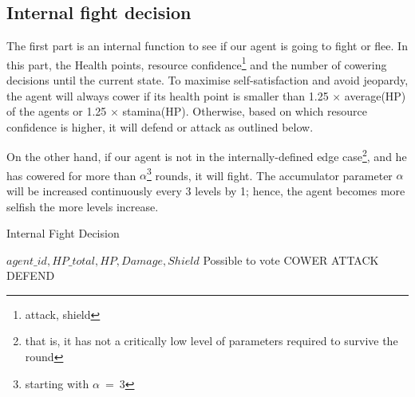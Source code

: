     \subsection{Internal fight decision}

        The first part is an internal function to see if our agent is going to fight or flee. In this part, the Health points, resource confidence\footnote{attack, shield} and the number of cowering decisions until the current state.
        To maximise self-satisfaction and avoid jeopardy, the agent will always cower if its health point is smaller  than  1.25 $\times$ average(HP) of the agents or 1.25 $\times$ stamina(HP). Otherwise, based on which resource confidence is higher, it will defend or attack as outlined below.

        On the other hand, if our agent is not in the internally-defined edge case\footnote{that is, it has not a critically low level of parameters required to survive the round}, and he has cowered for more than $\alpha$\footnote{starting with $\alpha~=~3$} rounds, it will fight. The accumulator parameter $\alpha$ will be increased continuously every 3 levels by 1; hence, the agent becomes more selfish the more levels increase.




\begin{algorithm}
\caption{Internal Fight Decision}\label{alg:8}
\begin{algorithmic} 
\scriptsize
\Require $agent\_id, HP\_total, HP, Damage, Shield$
\Ensure Possible to vote
\Return COWER
\EndIf
\Return ATTACK
\EndIf
{}
\Return DEFEND
\EndIf
\end{algorithmic}
\end{algorithm}



